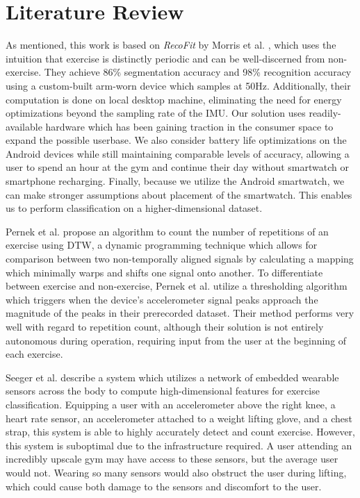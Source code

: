 \chapter{Literature Review}

As mentioned, this work is based on \textit{RecoFit} by Morris et al. \cite{recofit}, which uses the intuition that exercise is distinctly periodic and can be well-discerned from non-exercise. They achieve 86\% segmentation accuracy and 98\% recognition accuracy using a custom-built arm-worn device which samples at 50Hz. Additionally, their computation is done on local desktop machine, eliminating the need for energy optimizations beyond the sampling rate of the IMU. Our solution uses readily-available hardware which has been gaining traction in the consumer space \cite{lit:applewatch, lit:androidwear} to expand the possible userbase. We also consider battery life optimizations on the Android devices while still maintaining comparable levels of accuracy, allowing a user to spend an hour at the gym and continue their day without smartwatch or smartphone recharging. Finally, because we utilize the Android smartwatch, we can make stronger assumptions about placement of the smartwatch. This enables us to perform classification on a higher-dimensional dataset.

Pernek et al. \cite{dtw} propose an algorithm to count the number of repetitions of an exercise using DTW, a dynamic programming technique which allows for comparison between two non-temporally aligned signals by calculating a mapping which minimally warps and shifts one signal onto another. To differentiate between exercise and non-exercise, Pernek et al. utilize a thresholding algorithm which triggers when the device's accelerometer signal peaks approach the magnitude of the peaks in their prerecorded dataset. Their method performs very well with regard to repetition count, although their solution is not entirely autonomous during operation, requiring input from the user at the beginning of each exercise.

Seeger et al. \cite{seeger} describe a system which utilizes a network of embedded wearable sensors across the body to compute high-dimensional features for exercise classification. Equipping a user with an accelerometer above the right knee, a heart rate sensor, an accelerometer attached to a weight lifting glove, and a chest strap, this system is able to highly accurately detect and count exercise. However, this system is suboptimal due to the infrastructure required. A user attending an incredibly upscale gym may have access to these sensors, but the average user would not. Wearing so many sensors would also obstruct the user during lifting, which could cause both damage to the sensors and discomfort to the user. 

